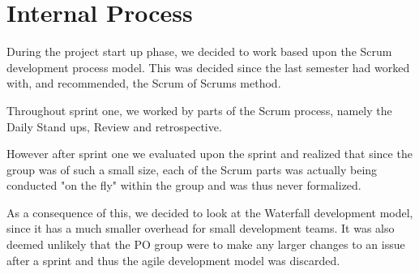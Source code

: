 \section{Internal Process}
During the project start up phase, we decided to work based upon the Scrum development process model.
This was decided since the last semester had worked with, and recommended, the Scrum of Scrums method. 

Throughout sprint one, we worked by parts of the Scrum process, namely the Daily Stand ups, Review and retrospective. 

However after sprint one we evaluated upon the sprint and realized that since the group was of such a small size, each of the Scrum parts was actually being conducted "on the fly" within the group and was thus never formalized. 

As a consequence of this, we decided to look at the Waterfall development model, since it has a much smaller overhead for small development teams. 
It was also deemed unlikely that the PO group were to make any larger changes to an issue after a sprint and thus the agile development model was discarded.






